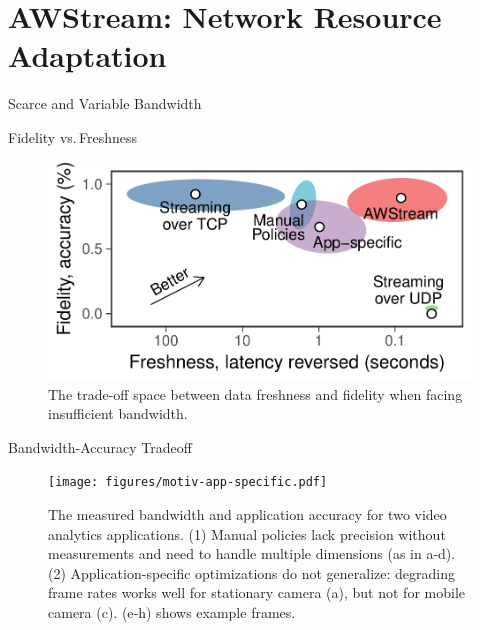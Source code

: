 \section{AWStream: Network Resource Adaptation}

\begin{frame}{Scarce and Variable Bandwidth}

\end{frame}

\begin{frame}{Fidelity vs.\,Freshness}
  \vspace{2em}
  \begin{figure}
    \centering
    \includegraphics[width=0.8\columnwidth]{figures/fidelity-freshness.pdf}
    \caption{The trade-off space between data freshness and fidelity when facing
      insufficient bandwidth.}
  \end{figure}
\end{frame}

\begin{frame}{Bandwidth-Accuracy Tradeoff}
  \begin{figure}
    \centering
    \texttt{[image: figures/motiv-app-specific.pdf]}
    \caption{The measured bandwidth and application accuracy for two video
      analytics applications. (1) Manual policies lack precision without
      measurements and need to handle multiple dimensions (as in a-d). (2)
      Application-specific optimizations do not generalize: degrading frame rates
      works well for stationary camera (a), but not for mobile camera (c). (e-h)
      shows example frames.}
    \label{fig:app-specific}
  \end{figure}
\end{frame}

